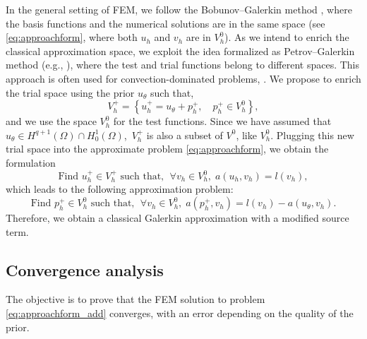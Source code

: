In the general setting of FEM, we follow the Bobunov--Galerkin method \cite{Ern2004TheoryAP}, where the basis functions and the numerical solutions are in the same space (see \eqref{eq:approachform}, where both $u_h$ and $v_h$ are in $V_h^0$).
As we intend to enrich the classical approximation space, we exploit the idea formalized as Petrov--Galerkin method (e.g., \cite{j2005introduction,brenner2008mathematical,demkowicz2023mathematical}), where the test and trial functions belong to different spaces.
This approach is often used for convection-dominated problems, \cite{ALMEIDA1997291}.
We propose to enrich the trial space using the prior $u_\theta$ such that,
\begin{equation}
    \label{eq:Vh_add}
    V_h^+ = \left\{
    u_h^+= u_{\theta} + p_h^+, \quad p_h^+ \in V_h^0
    \right\},
\end{equation}
and we use the space $V_h^0$ for the test functions.
Since we have assumed that $u_{\theta} \in H^{q+1}(\Omega)\cap H^1_0(\Omega)$,~$V_h^+$ is also a subset of $V^0$, like $V_h^0$.
Plugging this new trial space into the approximate problem \eqref{eq:approachform}, we obtain the formulation
\begin{equation}\label{eq:add1}
    \text{Find } u_h^+ \in V_h^+ \text{ such that, } \; \forall v_h\in V_h^0, \; a(u_h,v_h)=l(v_h),
\end{equation}
which leads to the following approximation problem:
\begin{equation}\label{eq:approachform_add}
    \text{Find } p_h^+ \in V_h^0 \text{ such that, } \;
    \forall v_h \in V_h^0, \; a(p_h^+,v_h) = l(v_h) - a(u_{\theta},v_h).
\end{equation}
Therefore, we obtain a classical Galerkin approximation with a modified source term.

\subsection{Convergence analysis}
\label{sec:error_estimates_add}

The objective is to prove that the FEM solution to problem \eqref{eq:approachform_add} converges, with an error depending on the quality of the prior.



